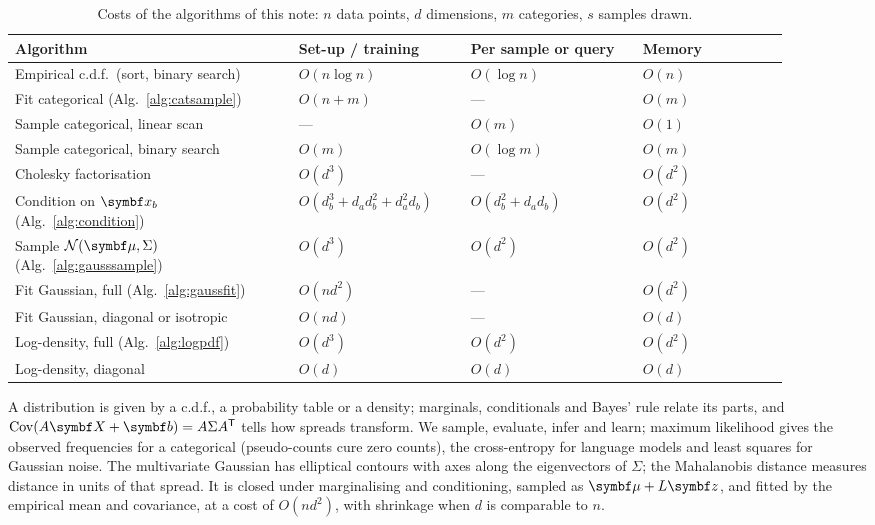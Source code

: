 \documentclass[11pt]{article}
\begin{document}
\begin{table}[h]\centering\small
\caption{Costs of the algorithms of this note: $n$ data points, $d$ dimensions, $m$ categories, $s$ samples drawn.}
\label{tab:costs}
\begin{tabular}{@{}L{0.33\linewidth}L{0.2\linewidth}L{0.2\linewidth}L{0.17\linewidth}@{}}\toprule
Algorithm & Set-up / training & Per sample or query & Memory \\ \midrule
Empirical c.d.f.\ (sort, binary search) & $O(n\log n)$ & $O(\log n)$ & $O(n)$ \\
Fit categorical (Alg.~\ref{alg:catsample}) & $O(n + m)$ & --- & $O(m)$ \\
Sample categorical, linear scan & --- & $O(m)$ & $O(1)$ \\
Sample categorical, binary search & $O(m)$ & $O(\log m)$ & $O(m)$ \\
Cholesky factorisation & $O(d^3)$ & --- & $O(d^2)$ \\
Condition on $\x_b$ (Alg.~\ref{alg:condition}) & $O(d_b^3 + d_ad_b^2 + d_a^2d_b)$ & $O(d_b^2 + d_ad_b)$ & $O(d^2)$ \\
Sample $\Normal(\vmu, \Sigma)$ (Alg.~\ref{alg:gausssample}) & $O(d^3)$ & $O(d^2)$ & $O(d^2)$ \\
Fit Gaussian, full (Alg.~\ref{alg:gaussfit}) & $O(nd^2)$ & --- & $O(d^2)$ \\
Fit Gaussian, diagonal or isotropic & $O(nd)$ & --- & $O(d)$ \\
Log-density, full (Alg.~\ref{alg:logpdf}) & $O(d^3)$ & $O(d^2)$ & $O(d^2)$ \\
Log-density, diagonal & $O(d)$ & $O(d)$ & $O(d)$ \\ \bottomrule
\end{tabular}
\end{table}

\begin{keyidea}[Summary]
A distribution is given by a c.d.f., a probability table or a density; marginals, conditionals and Bayes' rule
relate its parts, and $\Cov(A\X + \vect{b}) = A\Sigma A\T$ tells how spreads transform. We sample, evaluate, infer
and learn; maximum likelihood gives the observed frequencies for a categorical (pseudo-counts cure zero counts), the
cross-entropy for language models and least squares for Gaussian noise. The multivariate Gaussian has elliptical
contours with axes along the eigenvectors of $\Sigma$; the Mahalanobis distance measures distance in units of that
spread. It is closed under marginalising and conditioning, sampled as $\vmu + L\vect{z}$, and fitted by the empirical
mean and covariance, at a cost of $O(nd^2)$, with shrinkage when $d$ is comparable to $n$.
\end{keyidea}
\end{document}
